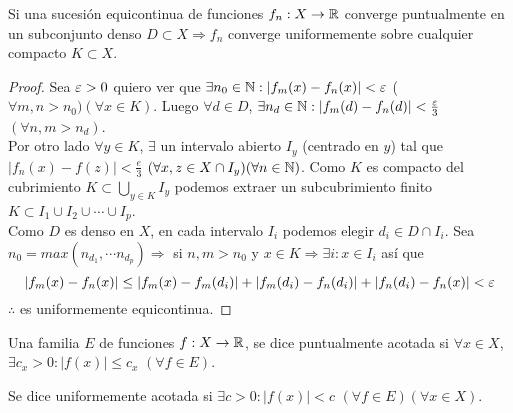 \begin{theorem}
  Si una sucesión equicontinua de funciones $f_n: X \to \mathbb{R}$ converge puntualmente en un subconjunto denso $D \subset X \Rightarrow f_n$ converge uniformemente sobre cualquier compacto $K \subset X$.

  \begin{proof}
    Sea $\varepsilon > 0$ quiero ver que $\exists n_0 \in \mathbb{N} : |f_m(x) - f_n(x)| < \varepsilon$ ($\forall m, n > n_0)(\forall x \in K)$. Luego $\forall d \in D$, $\exists n_d \in \mathbb{N} : |f_m(d) - f_n(d)| < \frac{\varepsilon}{3}$ $(\forall n, m > n_d)$. \\
    Por otro lado $\forall y \in K$, $\exists$ un intervalo abierto $I_y$ (centrado en $y$) tal que $|f_n(x) - f(z)| < \frac{e}{3}$ $(\forall x, z \in X \cap I_y)(\forall n \in \mathbb{N})$. Como $K$ es compacto del cubrimiento $K \subset \bigcup_{y \in K} I_y$ podemos extraer un subcubrimiento finito $K \subset I_1 \cup I_2 \cup \cdots \cup I_p$. \\
    Como $D$ es denso en $X$, en cada intervalo $I_i$ podemos elegir $d_i \in D \cap I_i$. Sea $n_0 = max(n_{d_1}, \cdots n_{d_p}) \Rightarrow$ si $n, m > n_0$ y $x \in K \Rightarrow \exists i : x \in I_i$ así que \begin{equation}
      |f_m(x) - f_n(x)| \leq |f_m(x) - f_m(d_i)| + |f_m(d_i) - f_n(d_i)| + |f_n(d_i) - f_n(x)| < \varepsilon
    \end{equation} $\therefore$ es uniformemente equicontinua.
  \end{proof}
\end{theorem}

\begin{definition}
  Una familia $E$ de funciones $f: X \to \mathbb{R}$, se dice puntualmente acotada si $\forall x \in X$, $\exists c_x > 0 : |f(x)| \leq c_x$ $(\forall f \in E)$.
\end{definition}

\begin{definition}
  Se dice uniformemente acotada si $\exists c > 0 : |f(x)| < c$ $(\forall f \in E)(\forall x \in X)$.
\end{definition}

